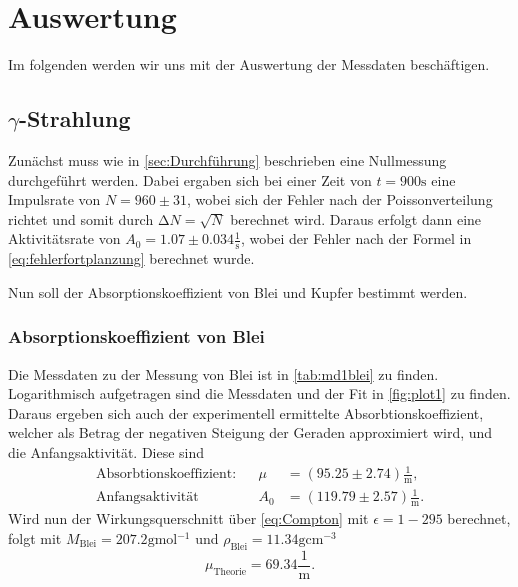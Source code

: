 \section{Auswertung}
\label{sec:Auswertung}

Im folgenden werden wir uns mit der Auswertung der Messdaten beschäftigen.

\subsection[Gamma-Strahlung]{$\gamma$-Strahlung}

Zunächst muss wie in \ref{sec:Durchführung} beschrieben eine Nullmessung durchgeführt werden.
Dabei ergaben sich bei einer Zeit von $t = 900 \unit\second$ eine Impulsrate von $N = 960 \pm 31$,
wobei sich der Fehler nach der Poissonverteilung richtet und somit durch $\increment N = \sqrt{N}$ berechnet wird.
Daraus erfolgt dann eine Aktivitätsrate von $A_0 = 1.07 \pm 0.034 \frac{1}{\unit\second}$, wobei der Fehler nach
der Formel in \autoref{eq:fehlerfortplanzung} berechnet wurde.

Nun soll der Absorptionskoeffizient von Blei und Kupfer bestimmt werden.

\subsubsection*{Absorptionskoeffizient von Blei}

Die Messdaten zu der Messung von Blei ist in \autoref{tab:md1blei} zu finden.
Logarithmisch aufgetragen sind die Messdaten und der Fit in \autoref{fig:plot1} zu finden.
Daraus ergeben sich auch der experimentell ermittelte Absorbtionskoeffizient, welcher als Betrag der negativen Steigung der Geraden approximiert wird, und die Anfangsaktivität.
Diese sind
\begin{align*}
    \text{Absorbtionskoeffizient:} && \mu &= (95.25 \pm 2.74) \frac{1}{\unit\meter},\\
    \text{Anfangsaktivität} && A_0 &= (119.79 \pm 2.57) \frac{1}{\unit\meter}.
\end{align*} 
Wird nun der Wirkungsquerschnitt über \autoref{eq:Compton} mit $\epsilon = 1-295$ berechnet,
folgt mit $M_\text{Blei} = 207.2 \unit{\gram\mol^{-1}}$ \cite{molaremasse} und $ \rho_\text{Blei} = 11.34 \unit{\gram\centi\meter^{-3}}$
\begin{equation}
    \mu_\text{Theorie} = 69.34 \frac{1}{\unit\meter}.
\end{equation}



